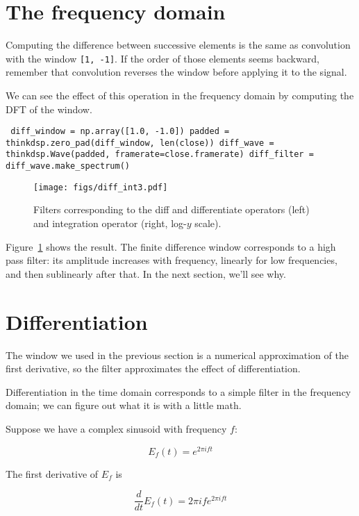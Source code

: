 \documentclass[12pt]{book} \usepackage[width=5.5in,height=8.5in, hmarginratio=3:2,vmarginratio=1:1]{geometry}
\begin{document}
\section{The frequency domain} 

Computing the difference between successive elements is the same as convolution with the window {\tt [1, -1]}. If the order of those elements seems backward, remember that convolution reverses the window before applying it to the signal. 

We can see the effect of this operation in the frequency domain by computing the DFT of the window. 

\begin{verbatim} diff_window = np.array([1.0, -1.0]) padded = thinkdsp.zero_pad(diff_window, len(close)) diff_wave = thinkdsp.Wave(padded, framerate=close.framerate) diff_filter = diff_wave.make_spectrum() \end{verbatim} 

\begin{figure} 

\centerline{\texttt{[image: figs/diff\_int3.pdf]}} \caption{Filters corresponding to the diff and differentiate operators (left) and integration operator (right, log-$y$ scale).} \label{fig.diff_int3} \end{figure} 

Figure~\ref{fig.diff_int3} shows the result. The finite difference window corresponds to a high pass filter: its amplitude increases with frequency, linearly for low frequencies, and then sublinearly after that. In the next section, we'll see why. 

\section{Differentiation} \label{effdiff} 

The window we used in the previous section is a numerical approximation of the first derivative, so the filter approximates the effect of differentiation. 

Differentiation in the time domain corresponds to a simple filter in the frequency domain; we can figure out what it is with a little math. 

Suppose we have a complex sinusoid with frequency $f$: 

%
\[ E_f(t) = e^{2 \pi i f t} \] 

%
The first derivative of $E_f$ is 

%
\[ \frac{d}{dt} E_f(t) = 2 \pi i f e^{2 \pi i f t} \] 
\end{document}
